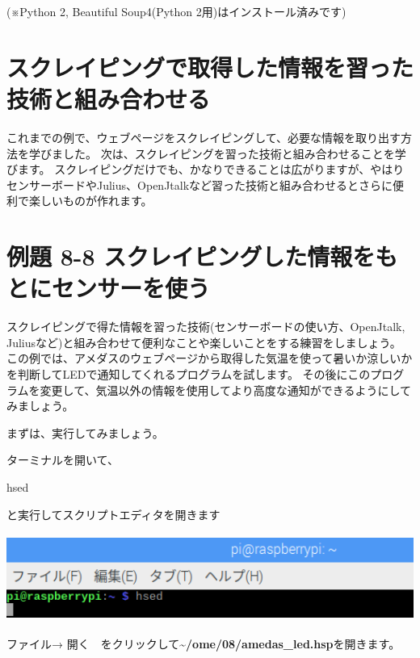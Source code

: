\documentclass[a4paper,12pt,dvipdfmx]{jarticle}
\begin{document}
(※Python 2, Beautiful Soup4(Python
2用)はインストール済みです)


\bigskip

\clearpage\section{スクレイピングで取得した情報を習った技術と組み合わせる}
これまでの例で、ウェブページをスクレイピングして、必要な情報を取り出す方法を学びました。
次は、スクレイピングを習った技術と組み合わせることを学びます。
スクレイピングだけでも、かなりできることは広がりますが、やはりセンサーボードやJulius、OpenJtalkなど習った技術と組み合わせるとさらに便利で楽しいものが作れます。


\clearpage\section{例題 8-8
スクレイピングした情報をもとにセンサーを使う}
スクレイピングで得た情報を習った技術(センサーボードの使い方、OpenJtalk,
Juliusなど)と組み合わせて便利なことや楽しいことをする練習をしましょう。
この例では、アメダスのウェブページから取得した気温を使って暑いか涼しいかを判断してLEDで通知してくれるプログラムを試します。
その後にこのプログラムを変更して、気温以外の情報を使用してより高度な通知ができるようにしてみましょう。

まずは、実行してみましょう。

ターミナルを開いて、

hsed 

と実行してスクリプトエディタを開きます

\begin{center}
\includegraphics[width=17.057cm,height=2.866cm]{textbook-img013.png}

\end{center}
ファイル→
開く　をクリックして\textbf{\~{}/ome/08/amedas\_led.hsp}を開きます。
\end{document}
